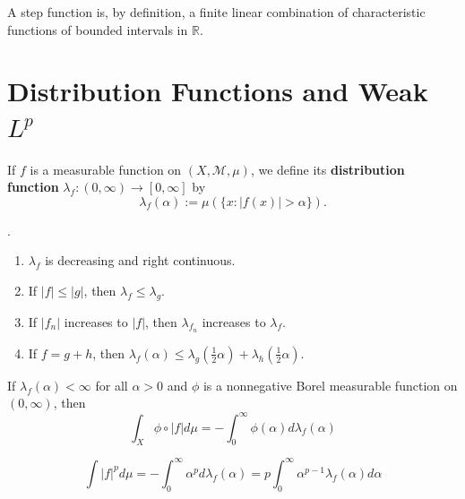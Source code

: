 \documentclass[12pt, a4paper, oneside]{book}
\begin{document}
\begin{theorem}
    A step function is, by definition, a finite linear combination of characteristic functions of bounded intervals in $\mathbb{R}$.
\end{theorem}

\section{Distribution Functions and Weak \texorpdfstring{$L^p$}{}} %


\begin{definition}
    If $f$ is a measurable function on $(X, \mathcal{M}, \mu)$, we define its \textbf{distribution function} $\lambda_f:(0, \infty) \rightarrow[0, \infty]$ by
    \begin{equation*}
        \lambda_f(\alpha):=\mu(\{x:|f(x)|>\alpha\}) .
    \end{equation*}
\end{definition}

\begin{proposition}.
    \begin{enumerate}
        \item
              $\lambda_f$ is decreasing and right continuous.
        \item
              If $|f| \leq|g|$, then $\lambda_f \leq \lambda_g$.
        \item
              If $\left|f_n\right|$ increases to $|f|$, then $\lambda_{f_n}$ increases to $\lambda_f$.
        \item
              If $f=g+h$, then $\lambda_f(\alpha) \leq \lambda_g\left(\frac{1}{2} \alpha\right)+\lambda_h\left(\frac{1}{2} \alpha\right)$.
    \end{enumerate}
\end{proposition}

\begin{theorem}
    If $\lambda_f(\alpha)<\infty$ for all $\alpha>0$ and $\phi$ is a nonnegative Borel measurable function on $(0, \infty)$, then
    \begin{equation*}
        \int_X \phi \circ|f| d \mu=-\int_0^{\infty} \phi(\alpha) d \lambda_f(\alpha)
    \end{equation*}
\end{theorem}
\begin{corollary}
    \begin{equation*}
        \int \left|f\right|^p d \mu=-\int_0^{\infty} \alpha^p d \lambda_f(\alpha)
        =
        p \int_0^{\infty} \alpha^{p-1} \lambda_f(\alpha) d \alpha
    \end{equation*}
\end{corollary}
\end{document}
